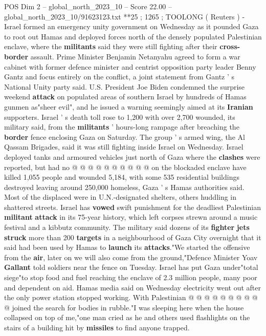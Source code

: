\begin{textsample}{POS Dim 2 – global\_north\_2023\_10 – Score 22.00 – global\_north\_2023\_10/91623123.txt}  \label{ex:f2_pos_148}
**25 ; 1265 ; TOOLONG ( Reuters ) - Israel formed an emergency unity government on Wednesday as it pounded Gaza to root out Hamas and deployed forces north of the densely populated Palestinian enclave, where the \textbf{militants} said they were still fighting after their \textbf{cross-border} assault.
Prime Minister Benjamin Netanyahu agreed to form a war cabinet with former defence minister and centrist opposition party leader Benny Gantz and focus entirely on the conflict, a joint statement from Gantz ' s National Unity party said.
U.S.
President Joe Biden condemned the surprise weekend \textbf{attack} on populated areas of southern Israel by hundreds of Hamas gunmen as"sheer evil", and he issued a warning seemingly aimed at its \textbf{Iranian} supporters.
Israel ' s death toll rose to 1,200 with over 2,700 wounded, its military said, from the \textbf{militants} ' hours-long rampage after breaching the \textbf{border} fence enclosing Gaza on Saturday.
The group ' s armed wing, the Al Qassam Brigades, said it was still fighting inside Israel on Wednesday.
Israel deployed tanks and armoured vehicles just north of Gaza where the \textbf{clashes} were reported, but had no @ @ @ @ @ @ @ @ @ @ on the blockaded enclave have killed 1,055 people and wounded 5,184, with some 535 residential buildings destroyed leaving around 250,000 homeless, Gaza ' s Hamas authorities said.
Most of the displaced were in U.N.-designated shelters, others huddling in shattered streets.
Israel has \textbf{vowed} swift punishment for the deadliest Palestinian \textbf{militant} \textbf{attack} in its 75-year history, which left corpses strewn around a music festival and a kibbutz community.
The military said dozens of its \textbf{fighter} \textbf{jets} \textbf{struck} more than 200 \textbf{targets} in a neighbourhood of Gaza City overnight that it said had been used by Hamas to \textbf{launch} its \textbf{attacks}."We started the offensive from the \textbf{air}, later on we will also come from the ground,"Defence Minister Yoav \textbf{Gallant} told soldiers near the fence on Tuesday.
Israel has put Gaza under"total siege"to stop food and fuel reaching the enclave of 2.3 million people, many poor and dependent on aid.
Hamas media said on Wednesday electricity went out after the only power station stopped working.
With Palestinian @ @ @ @ @ @ @ @ @ @ joined the search for bodies in rubble."I was sleeping here when the house collapsed on top of me,"one man cried as he and others used flashlights on the stairs of a building hit by \textbf{missiles} to find anyone trapped.

\end{textsample}
